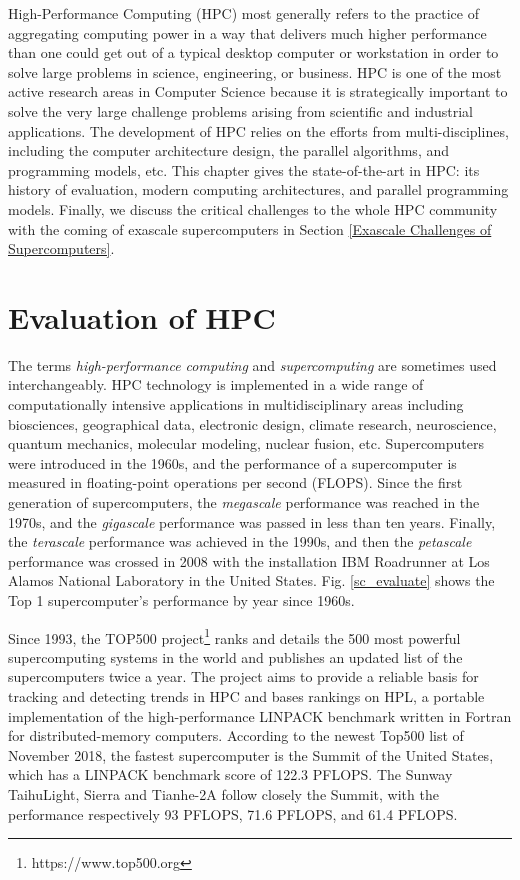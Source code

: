 \begin{displayquote}
	\textsf{High-Performance Computing (HPC) most generally refers to the practice of aggregating computing power in a way that delivers much higher performance than one could get out of a typical desktop computer or workstation in order to solve large problems in science, engineering, or business. HPC is one of the most active research areas in Computer Science because it is strategically important to solve the very large challenge problems arising from scientific and industrial applications. The development of HPC relies on the efforts from multi-disciplines, including the computer architecture design, the parallel algorithms, and programming models, etc. This chapter gives the state-of-the-art in HPC: its history of evaluation, modern computing architectures, and parallel programming models. Finally, we discuss the critical challenges to the whole HPC community with the coming of exascale supercomputers in Section \ref{Exascale Challenges of Supercomputers}.}
\end{displayquote}

\vspace{0.6in}

\section{Evaluation of HPC}

The terms \textit{high-performance computing} and \textit{supercomputing} are sometimes used interchangeably. HPC technology is implemented in a wide range of computationally intensive applications in multidisciplinary areas including biosciences, geographical data, electronic design, climate research, neuroscience, quantum mechanics, molecular modeling, nuclear fusion, etc. Supercomputers were introduced in the 1960s, and the performance of a supercomputer is measured in floating-point operations per second (FLOPS). Since the first generation of supercomputers, the \textit{megascale} performance was reached in the 1970s, and the \textit{gigascale} performance was passed in less than ten years. Finally, the \textit{terascale} performance was achieved in the 1990s, and then the \textit{petascale} performance was crossed in 2008 with the installation IBM Roadrunner at Los Alamos National Laboratory in the United States. Fig. \ref{sc_evaluate} shows the Top 1 supercomputer's performance by year since 1960s.

Since 1993, the TOP500 project\footnote{https://www.top500.org} ranks and details the 500 most powerful supercomputing systems in the world and publishes an updated list of the supercomputers twice a year. The project aims to provide a reliable basis for tracking and detecting trends in HPC and bases rankings on HPL, a portable implementation of the high-performance LINPACK benchmark written in Fortran for distributed-memory computers. According to the newest Top500 list of November 2018, the fastest supercomputer is the Summit of the United States, which has a LINPACK benchmark score of 122.3 PFLOPS. The Sunway TaihuLight, Sierra and Tianhe-2A follow closely the Summit, with the performance respectively 93 PFLOPS, 71.6 PFLOPS, and 61.4 PFLOPS. 

